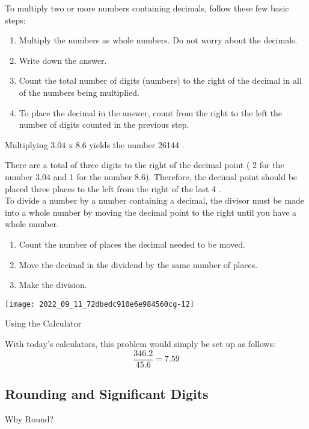 To multiply two or more numbers containing decimals, follow these few basic steps:

\begin{enumerate}
  \item Multiply the numbers as whole numbers. Do not worry about the decimals.

  \item Write down the answer.

  \item Count the total number of digits (numbers) to the right of the decimal in all of the numbers being multiplied.

  \item To place the decimal in the answer, count from the right to the left the number of digits counted in the previous step.

\end{enumerate}

Multiplying $3.04$ x $8.6$ yields the number 26144 .

There are a total of three digits to the right of the decimal point ( 2 for the number $3.04$ and 1 for the number 8.6). Therefore, the decimal point should be placed three places to the left from the right of the last 4 .\\

To divide a number by a number containing a decimal, the divisor must be made into a whole number by moving the decimal point to the right until you have a whole number.

\begin{enumerate}
  \item Count the number of places the decimal needed to be moved.

  \item Move the decimal in the dividend by the same number of places.

  \item Make the division.

\end{enumerate}
\texttt{[image: 2022\_09\_11\_72dbedc910e6e984560cg-12]}

Using the Calculator

With today's calculators, this problem would simply be set up as follows:
$$
\frac{346.2}{45.6}=7.59
$$




\subsection{Rounding and Significant Digits}
Why Round?


